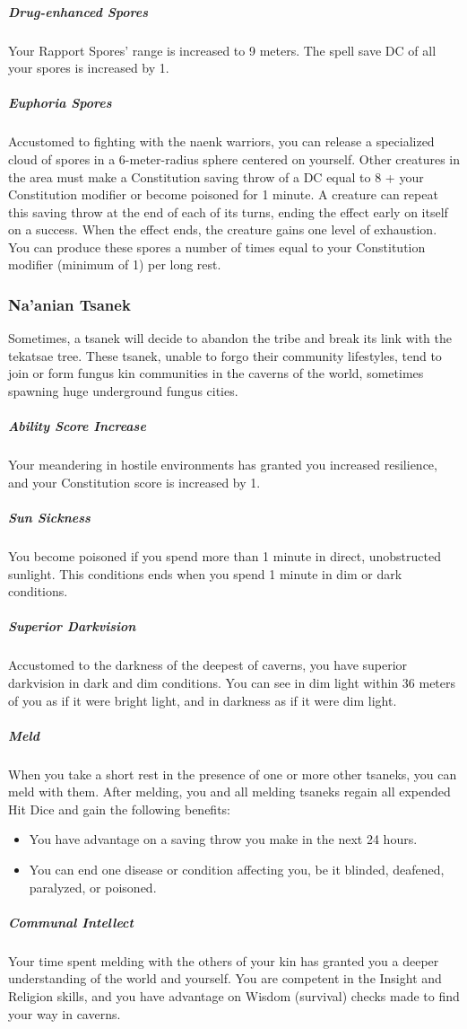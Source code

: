 \begin{linenumbers}
\subparagraph{Drug-enhanced Spores} Your Rapport Spores' range is increased to 9 meters.
The spell save DC of all your spores is increased by 1.

\subparagraph{Euphoria Spores} Accustomed to fighting with the naenk warriors, you can release a specialized cloud of spores in a 6-meter-radius sphere centered on yourself.
Other creatures in the area must make a Constitution saving throw of a DC equal to 8 + your Constitution modifier or become poisoned for 1 minute.
A creature can repeat this saving throw at the end of each of its turns, ending the effect early on itself on a success.
When the effect ends, the creature gains one level of exhaustion.
You can produce these spores a number of times equal to your Constitution modifier (minimum of 1) per long rest.

\subsubsection{Na'anian Tsanek}
Sometimes, a tsanek will decide to abandon the tribe and break its link with the tekatsae tree.
These tsanek, unable to forgo their community lifestyles, tend to join or form fungus kin communities in the caverns of the world, sometimes spawning huge underground fungus cities.

\subparagraph{Ability Score Increase} Your meandering in hostile environments has granted you increased resilience, and your Constitution score is increased by 1.

\subparagraph{Sun Sickness} You become poisoned if you spend more than 1 minute in direct, unobstructed sunlight.
This conditions ends when you spend 1 minute in dim or dark conditions.

\subparagraph{Superior Darkvision} Accustomed to the darkness of the deepest of caverns, you have superior darkvision in dark and dim conditions.
You can see in dim light within 36 meters of you as if it were bright light, and in darkness as if it were dim light.

\subparagraph{Meld} When you take a short rest in the presence of one or more other tsaneks, you can meld with them.
After melding, you and all melding tsaneks regain all expended Hit Dice and gain the following benefits:
\begin{itemize}
    \item You have advantage on a saving throw you make in the next 24 hours.
    \item You can end one disease or condition affecting you, be it blinded, deafened, paralyzed, or poisoned.
\end{itemize}

\subparagraph{Communal Intellect} Your time spent melding with the others of your kin has granted you a deeper understanding of the world and yourself.
You are competent in the Insight and Religion skills, and you have advantage on Wisdom (survival) checks made to find your way in caverns.

\end{linenumbers}

\newpage
